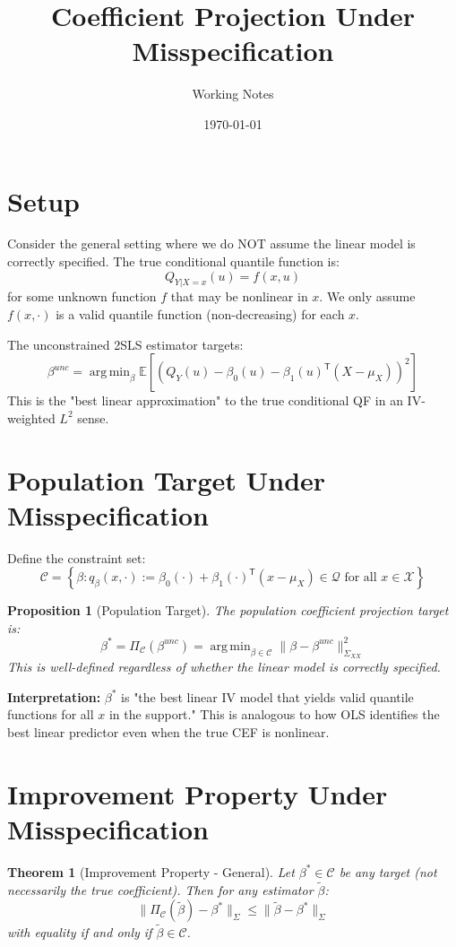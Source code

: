 \documentclass[11pt]{article}
\title{Coefficient Projection Under Misspecification}
\author{Working Notes}
\date{\today}
\newcommand{\E}{\mathbb{E}}
\newcommand{\calC}{\mathcal{C}}
\newcommand{\calQ}{\mathcal{Q}}
\newcommand{\T}{\mathsf{T}}
\DeclareMathOperator*{\argmin}{arg\,min}
\newtheorem{theorem}{Theorem}
\newtheorem{proposition}{Proposition}
\begin{document}
\maketitle

\section{Setup}

Consider the general setting where we do NOT assume the linear model is correctly specified. The true conditional quantile function is:
\[
Q_{Y|X=x}(u) = f(x, u)
\]
for some unknown function $f$ that may be nonlinear in $x$. We only assume $f(x, \cdot)$ is a valid quantile function (non-decreasing) for each $x$.

The unconstrained 2SLS estimator targets:
\[
\beta^{unc} = \argmin_{\beta} \E\left[ \left( Q_{Y}(u) - \beta_0(u) - \beta_1(u)^\T(X - \mu_X) \right)^2 \right]
\]
This is the "best linear approximation" to the true conditional QF in an IV-weighted $L^2$ sense.

\section{Population Target Under Misspecification}

Define the constraint set:
\[
\calC = \left\{ \beta : q_\beta(x, \cdot) := \beta_0(\cdot) + \beta_1(\cdot)^\T(x - \mu_X) \in \calQ \text{ for all } x \in \mathcal{X} \right\}
\]

\begin{proposition}[Population Target]
The population coefficient projection target is:
\[
\beta^* = \Pi_\calC(\beta^{unc}) = \argmin_{\beta \in \calC} \|\beta - \beta^{unc}\|_{\Sigma_{XX}}^2
\]
This is well-defined regardless of whether the linear model is correctly specified.
\end{proposition}

\textbf{Interpretation:} $\beta^*$ is "the best linear IV model that yields valid quantile functions for all $x$ in the support." This is analogous to how OLS identifies the best linear predictor even when the true CEF is nonlinear.

\section{Improvement Property Under Misspecification}

\begin{theorem}[Improvement Property - General]\label{thm:improvement_misspec}
Let $\beta^* \in \calC$ be any target (not necessarily the true coefficient). Then for any estimator $\tilde{\beta}$:
\[
\|\Pi_\calC(\tilde{\beta}) - \beta^*\|_{\Sigma} \leq \|\tilde{\beta} - \beta^*\|_{\Sigma}
\]
with equality if and only if $\tilde{\beta} \in \calC$.
\end{theorem}
\end{document}
